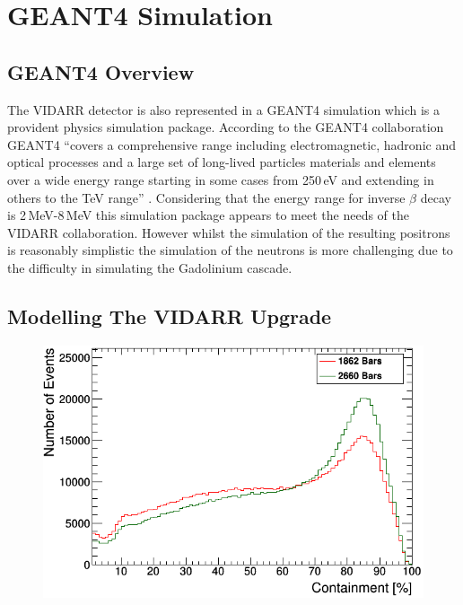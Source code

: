 

\chapter{GEANT4 Simulation}\label{chp:geant4Simulation}
\ifpdf
    \graphicspath{{Chapter4/Figs/Raster/}{Chapter4/Figs/PDF/}{Chapter4/Figs/}}
\else
    \graphicspath{{Chapter4/Figs/Vector/}{Chapter4/Figs/}}
\fi

\section{GEANT4 Overview}\label{sec:geant4Simulation_g4Overview}
The VIDARR detector is also represented in a GEANT4 simulation which is a provident physics simulation package. According to the GEANT4 collaboration GEANT4 ``covers a comprehensive range including electromagnetic, hadronic and optical processes and a large set of long-lived particles materials and elements over a wide energy range starting in some cases from 250\,eV and extending in others to the TeV range'' \cite{Agostinelli:2002hh}. Considering that the energy range for inverse $\beta$ decay is 2\,MeV-8\,MeV \cite{Mueller_2011} this simulation package appears to meet the needs of the VIDARR collaboration. However whilst the simulation of the resulting positrons is reasonably simplistic the simulation of the neutrons is more challenging due to the difficulty in simulating the Gadolinium cascade. 

\section{Modelling The VIDARR Upgrade}

\begin{figure}[htbp]
 \centering
 \includegraphics[width=0.7\linewidth]{Chapter4/Figs/Raster/containment_Energy.png}
 \label{fig:containment_comparison}
\end{figure} 


